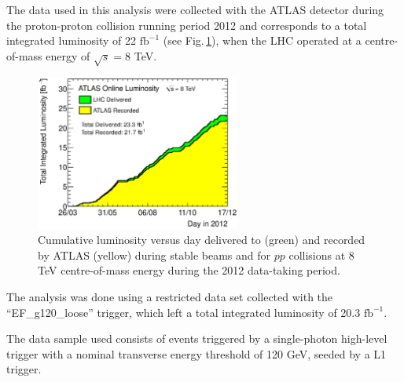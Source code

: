 \documentclass[12pt, twoside]{article}
\numberwithin{equation}{section}
\numberwithin{figure}{section}
\begin{document}
The data used in this analysis were collected with the ATLAS detector during the proton-proton collision running period 2012 and corresponds to a total integrated luminosity of 22 $\text{fb}^{-1}$ (see Fig.\,\ref{fig:IntegratedLuminosity}), when the LHC operated at a centre-of-mass energy of $\sqrt{s} = 8$ TeV.
\begin{figure}[h]
    \centering
    \includegraphics[width=0.6\textwidth]{./images/ATLAS_SumLumiByDay.eps}
    \captionsetup{width=0.9\textwidth}
    \caption{Cumulative luminosity versus day delivered to (green) and recorded by ATLAS (yellow) during stable beams and for $pp$ collisions at 8 TeV centre-of-mass energy during the 2012 data-taking period.}
    \label{fig:IntegratedLuminosity}
\end{figure}

The analysis was done using a restricted data set collected with the ``EF\_g120\_loose'' trigger, which left a total integrated luminosity of 20.3 $\text{fb}^{-1}$.

The data sample used consists of events triggered by a single-photon high-level trigger with a nominal transverse energy threshold of 120 GeV, seeded by a L1 trigger.
\end{document}
